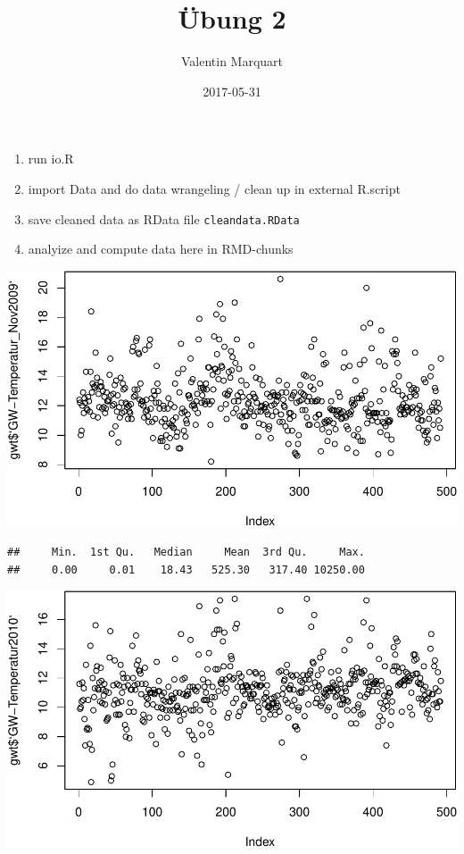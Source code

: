 \documentclass[]{article}
\title{Übung 2}
\author{Valentin Marquart}
\date{2017-05-31}
\newenvironment{Shaded}{\begin{snugshade}}{\end{snugshade}}
\newcommand{\KeywordTok}[1]{\textcolor[rgb]{0.13,0.29,0.53}{\textbf{{#1}}}}
\newcommand{\DataTypeTok}[1]{\textcolor[rgb]{0.13,0.29,0.53}{{#1}}}
\newcommand{\StringTok}[1]{\textcolor[rgb]{0.31,0.60,0.02}{{#1}}}
\newcommand{\CommentTok}[1]{\textcolor[rgb]{0.56,0.35,0.01}{\textit{{#1}}}}
\newcommand{\NormalTok}[1]{{#1}}
\begin{document}
\maketitle


\begin{enumerate}
\def\labelenumi{\arabic{enumi}.}
\itemsep1pt\parskip0pt
\item
  run io.R
\item
  import Data and do data wrangeling / clean up in external R.script
\item
  save cleaned data as RData file \texttt{cleandata.RData}
\item
  analyize and compute data here in RMD-chunks
\end{enumerate}

\includegraphics{Markdown-template_files/figure-latex/unnamed-chunk-1-1.pdf}

\begin{verbatim}
##     Min.  1st Qu.   Median     Mean  3rd Qu.     Max. 
##     0.00     0.01    18.43   525.30   317.40 10250.00
\end{verbatim}

\begin{Shaded}
\end{Shaded}

\includegraphics{Markdown-template_files/figure-latex/unnamed-chunk-2-1.pdf}
\end{document}
